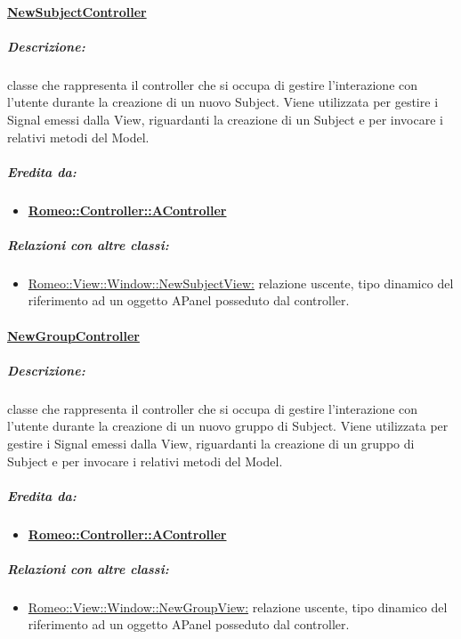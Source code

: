 	\paragraph{\underline{NewSubjectController}}
	\label{controller_ns}
		\subparagraph{Descrizione:} classe che rappresenta il controller che si occupa di gestire l'interazione con l'utente durante la creazione di un nuovo Subject\glossario{}.
		Viene utilizzata per gestire i Signal\g{} emessi dalla View, riguardanti la creazione di un Subject\glossario{} e per invocare i relativi metodi del Model.
		\subparagraph{Eredita da:}
			\begin{itemize}
			 	\item \textbf{\hyperref[controller_a]{Romeo::Controller::AController}}
			 \end{itemize}
		\subparagraph{Relazioni con altre classi:}
			\begin{itemize}
				\item \hyperref[nsv]{Romeo::View::Window::NewSubjectView:} relazione uscente, tipo dinamico del riferimento ad un oggetto APanel posseduto dal controller.
			\end{itemize}
			 
	
	\paragraph{\underline{NewGroupController}}
	\label{controller_ngs}
		\subparagraph{Descrizione:} classe che rappresenta il controller che si occupa di gestire l'interazione con l'utente durante la creazione di un nuovo gruppo di Subject\glossario{}. Viene utilizzata per gestire i Signal\g{} emessi dalla View, riguardanti la creazione di un gruppo di Subject\glossario{} e per invocare i relativi metodi del Model.
		\subparagraph{Eredita da:} 
			\begin{itemize}
				\item \textbf{\hyperref[controller_a]{Romeo::Controller::AController}}
			\end{itemize}		
		\subparagraph{Relazioni con altre classi:}
			\begin{itemize}
				\item \hyperref[ngv]{Romeo::View::Window::NewGroupView:} relazione uscente, tipo dinamico del riferimento ad un oggetto APanel posseduto dal controller.
			\end{itemize}

